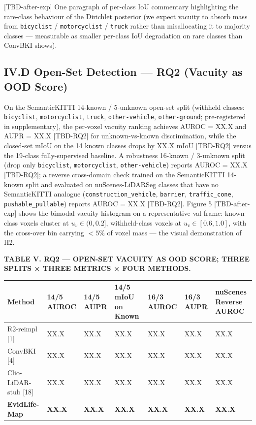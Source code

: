 \documentclass[
]{article}
\newcounter{none} %
\begin{document}
{[}TBD-after-exp{]} One paragraph of per-class IoU commentary
highlighting the rare-class behaviour of the Dirichlet posterior (we
expect vacuity to absorb mass from \texttt{bicyclist} /
\texttt{motorcyclist} / \texttt{truck} rather than misallocating it to
majority classes --- measurable as smaller per-class IoU degradation on
rare classes than ConvBKI shows).

\subsection{IV.D Open-Set Detection --- RQ2 (Vacuity as OOD
Score)}\label{ivd-open-set-detection--rq2-vacuity-as-ood-score}

On the SemanticKITTI 14-known / 5-unknown open-set split (withheld
classes: \texttt{bicyclist}, \texttt{motorcyclist}, \texttt{truck},
\texttt{other-vehicle}, \texttt{other-ground}; pre-registered in
supplementary), the per-voxel vacuity ranking achieves AUROC = XX.X and
AUPR = XX.X {[}TBD-RQ2{]} for unknown-vs-known discrimination, while the
closed-set mIoU on the 14 known classes drops by XX.X mIoU {[}TBD-RQ2{]}
versus the 19-class fully-supervised baseline. A robustness 16-known /
3-unknown split (drop only \texttt{bicyclist}, \texttt{motorcyclist},
\texttt{other-vehicle}) reports AUROC = XX.X {[}TBD-RQ2{]}; a reverse
cross-domain check trained on the SemanticKITTI 14-known split and
evaluated on nuScenes-LiDARSeg classes that have no SemanticKITTI
analogue (\texttt{construction\_vehicle}, \texttt{barrier},
\texttt{traffic\_cone}, \texttt{pushable\_pullable}) reports AUROC =
XX.X {[}TBD-RQ2{]}. Figure 5 {[}TBD-after-exp{]} shows the bimodal
vacuity histogram on a representative val frame: known-class voxels
cluster at \(u_v \in (0, 0.2]\), withheld-class voxels at
\(u_v \in [0.6, 1.0]\), with the cross-over bin carrying \(< 5\%\) of
voxel mass --- the visual demonstration of H2.

\textbf{TABLE V. RQ2 --- OPEN-SET VACUITY AS OOD SCORE; THREE SPLITS ×
THREE METRICS × FOUR METHODS.}

{\def\LTcaptype{none} %
\begin{longtable}[]{@{}lllllll@{}}
\toprule\noalign{}
Method & 14/5 AUROC & 14/5 AUPR & 14/5 mIoU on Known & 16/3 AUROC & 16/3
AUPR & nuScenes Reverse AUROC \\
\midrule\noalign{}
\endhead
\bottomrule\noalign{}
\endlastfoot
R2-reimpl {[}1{]} & XX.X & XX.X & XX.X & XX.X & XX.X & XX.X \\
ConvBKI {[}4{]} & XX.X & XX.X & XX.X & XX.X & XX.X & XX.X \\
Clio-LiDAR-stub {[}18{]} & XX.X & XX.X & XX.X & XX.X & XX.X & XX.X \\
\textbf{EvidLife-Map} & \textbf{XX.X} & \textbf{XX.X} & \textbf{XX.X} &
\textbf{XX.X} & \textbf{XX.X} & \textbf{XX.X} \\
\end{longtable}
}
\end{document}
